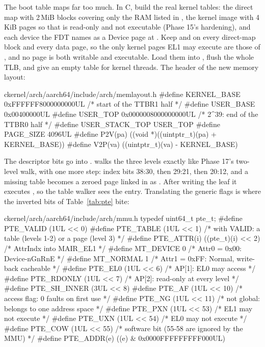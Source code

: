 \documentclass[11pt,a4paper]{article}
\begin{document}
The boot table maps far too much. In C, build the real kernel tables: the direct map with 2\,MiB blocks covering only
the RAM listed in , the kernel image with 4\,KiB pages so that  is read-only and
 not executable (Phase 15's hardening), and each device the FDT names as a Device page at
. Keep  and  on every direct-map block and every data page, so the only kernel
pages EL1 may execute are those of , and no page is both writable and executable. Load them into , flush the whole TLB, and give  an empty table for
kernel threads. The header of the new memory layout:

\begin{lst}{c}{kernel/arch/aarch64/include/arch/memlayout.h}
#define KERNEL_BASE     0xFFFFFF8000000000UL    /* start of the TTBR1 half */
#define USER_BASE       0x00400000UL
#define USER_TOP        0x0000008000000000UL    /* 2^39: end of the TTBR0 half */
#define USER_STACK_TOP  USER_TOP
#define PAGE_SIZE       4096UL
#define P2V(pa)         ((void *)((uintptr_t)(pa) + KERNEL_BASE))
#define V2P(va)         ((uintptr_t)(va) - KERNEL_BASE)
\end{lst}

The descriptor bits go into .  walks the three levels exactly like Phase 17's
two-level walk, with one more step: index bits 38:30, then 29:21, then 20:12, and a missing table becomes a zeroed
page linked in as . After writing the leaf it executes , so the
table walker sees the entry. Translating the generic  flags is where the inverted bits of
Table~\ref{tab:pte} bite:

\begin{lst}{c}{kernel/arch/aarch64/include/arch/mmu.h}
typedef uint64_t pte_t;
#define PTE_VALID    (1UL << 0)
#define PTE_TABLE    (1UL << 1)         /* with VALID: a table (levels 1-2) or a page (level 3) */
#define PTE_ATTR(i)  ((pte_t)(i) << 2)  /* AttrIndx into MAIR_EL1 */
#define MT_DEVICE    0                  /* Attr0 = 0x00: Device-nGnRnE */
#define MT_NORMAL    1                  /* Attr1 = 0xFF: Normal, write-back cacheable */
#define PTE_EL0      (1UL << 6)         /* AP[1]: EL0 may access */
#define PTE_RDONLY   (1UL << 7)         /* AP[2]: read-only at every level */
#define PTE_SH_INNER (3UL << 8)
#define PTE_AF       (1UL << 10)        /* access flag: 0 faults on first use */
#define PTE_NG       (1UL << 11)        /* not global: belongs to one address space */
#define PTE_PXN      (1UL << 53)        /* EL1 may not execute */
#define PTE_UXN      (1UL << 54)        /* EL0 may not execute */
#define PTE_COW      (1UL << 55)        /* software bit (55-58 are ignored by the MMU) */
#define PTE_ADDR(e)  ((e) & 0x0000FFFFFFFFF000UL)
\end{lst}
\end{document}
